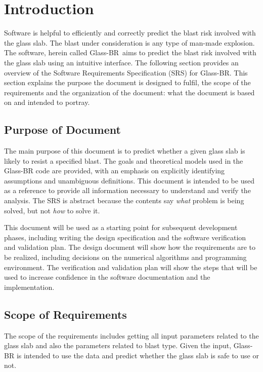 \documentclass[12pt]{article}
\newcommand{\progname}{Glass-BR}
\begin{document}
\section{Introduction}

Software is helpful to efficiently and correctly predict the blast risk involved
with the glass slab. The blast under consideration is any type of man-made
explosion. The software, herein called \progname\ aims to predict the blast risk
involved with the glass slab using an intuitive interface.  The following
section provides an overview of the Software Requirements Specification (SRS)
for \progname.  This section explains the purpose the document is designed to
fulfil, the scope of the requirements and the organization of the document: what
the document is based on and intended to portray.

\subsection{Purpose of Document}

The main purpose of this document is to predict whether a given glass slab is
likely to resist a specified blast.  The goals and theoretical models used in
the \progname{} code are provided, with an emphasis on explicitly identifying
assumptions and unambiguous definitions.  This document is intended to be used
as a reference to provide all information necessary to understand and verify the
analysis.  The SRS is abstract because the contents say \emph{what} problem is
being solved, but not \emph{how} to solve it.

This document will be used as a starting point for subsequent development
phases, including writing the design specification and the software verification
and validation plan.  The design document will show how the requirements are to
be realized, including decisions on the numerical algorithms and programming
environment.  The verification and validation plan will show the steps that will
be used to increase confidence in the software documentation and the
implementation.


\subsection{Scope of Requirements} 

The scope of the requirements includes getting all input parameters related to
the glass slab and also the parameters related to blast type. Given the input,
\progname{} is intended to use the data and predict whether the glass slab is
safe to use or not.
\end{document}
